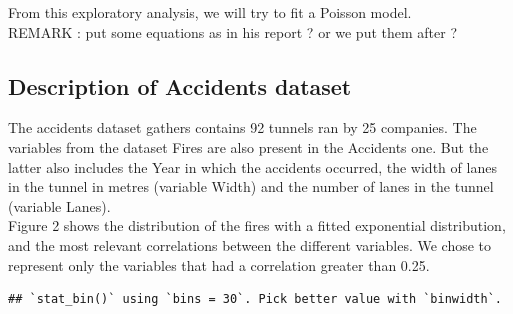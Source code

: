 \documentclass[
]{article}
\begin{document}
From this exploratory analysis, we will try to fit a Poisson model.\\
REMARK : put some equations as in his report ? or we put them after ?\\

\hypertarget{description-of-accidents-dataset}{%
\subsection{Description of Accidents
dataset}\label{description-of-accidents-dataset}}

The accidents dataset gathers contains 92 tunnels ran by 25 companies.
The variables from the dataset Fires are also present in the Accidents
one. But the latter also includes the Year in which the accidents
occurred, the width of lanes in the tunnel in metres (variable Width)
and the number of lanes in the tunnel (variable Lanes).\\

Figure 2 shows the distribution of the fires with a fitted exponential
distribution, and the most relevant correlations between the different
variables. We chose to represent only the variables that had a
correlation greater than 0.25.\\

\begin{verbatim}
## `stat_bin()` using `bins = 30`. Pick better value with `binwidth`.
\end{verbatim}
\end{document}
